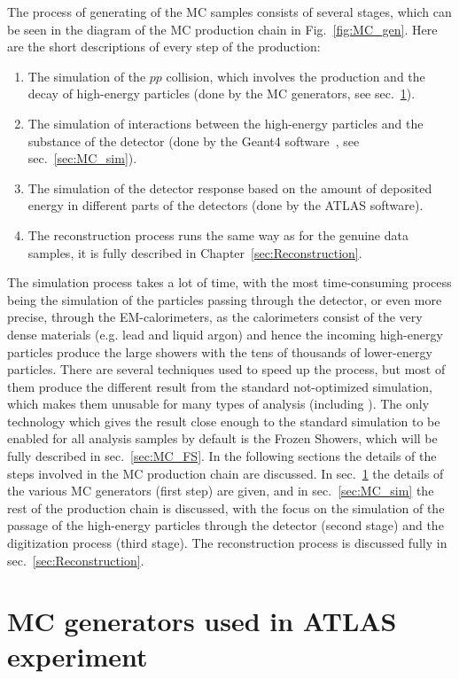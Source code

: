 The process of generating of the MC samples consists of several stages, which can be seen in the diagram of the MC production chain in Fig.~\ref{fig:MC_gen}. Here are the short descriptions of every step of the production:
\begin{enumerate}
\item The simulation of the $pp$ collision, which involves the production and the decay of high-energy particles (done by the MC generators, see sec.~\ref{sec:MC_gen}).
\item The simulation of interactions between the high-energy particles and the substance of the detector (done by the Geant4 software~\cite{lib:geant4}, see sec.~\ref{sec:MC_sim}).
\item The simulation of the detector response based on the amount of deposited energy in different parts of the detectors (done by the ATLAS software).
\item The reconstruction process runs the same way as for the genuine data samples, it is fully described in Chapter~\ref{sec:Reconstruction}.
\end{enumerate}
The simulation process takes a lot of time, with the most time-consuming process being the simulation of the particles passing through the detector, or even more precise, through the EM-calorimeters, as the calorimeters consist of the very dense materials (e.g. lead and liquid argon) and hence the incoming high-energy particles produce the large showers with the tens of thousands of lower-energy particles. There are several techniques used to speed up the process, but most of them produce the different result from the standard not-optimized simulation, which makes them unusable for many types of analysis (including \Zee). The only technology which gives the result close enough to the standard simulation to be enabled for all analysis samples by default is the Frozen Showers, which will be fully described in sec.~\ref{sec:MC_FS}. In the following sections the details of the steps involved in the MC production chain are discussed. In sec.~\ref{sec:MC_gen} the details of the various MC generators (first step) are given, and in sec.~\ref{sec:MC_sim} the rest of the production chain is discussed, with the focus on the simulation of the passage of the high-energy particles through the detector (second stage) and the digitization process (third stage). The reconstruction process is discussed fully in sec.~\ref{sec:Reconstruction}.

\section{MC generators used in ATLAS experiment}
\label{sec:MC_gen}

